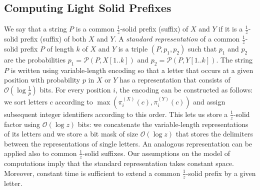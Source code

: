 \documentclass{article}
\theoremstyle{plain}
\theoremstyle{definition}
\newcommand{\Oh}{\mathcal{O}}
\renewcommand{\P}{\mathcal{P}}
\newcommand{\fr}{\ensuremath{\frac1z}}
\begin{document}
      
      \subsection{Computing Light Solid Prefixes}
    
    We say that a string $P$ is a common \fr-solid prefix (suffix) of $X$ and $Y$
    if it is a \fr-solid prefix (suffix) of both $X$ and $Y$.
    A \emph{standard representation} of a common \fr-solid prefix $P$ of length $k$ of $X$ and $Y$ is a triple $(P,p_1,p_2)$
    such that $p_1$ and $p_2$ are the probabilities $p_1 = \P(P,X[1..k])$ and $p_2 = \P(P,Y[1..k])$.
    The string $P$ is written using variable-length encoding so that a letter that occurs at
    a given position with probability $p$ in $X$ or $Y$ has a representation that consists of $\Oh(\log\frac1p)$ bits. For every position $i$, the encoding can be constructed as follows: we sort letters $c$ according to $\max(\pi_i^{(X)}(c), \pi_i^{(Y)}(c))$ and assign subsequent integer identifiers according to this order.
     This lets us store a \fr-solid factor using $\Oh(\log z)$ bits: 
     we concatenate the variable-length representations of its letters and we store a bit mask of size $\Oh(\log z)$ 
     that stores the delimiters between the representations of single letters.
    An analogous representation can be applied also to common \fr-solid suffixes.
    Our assumptions on the model of computations imply that the standard representation takes constant space.
    Moreover, constant time is sufficient to extend a common \fr-solid prefix by a given letter.
\end{document}
